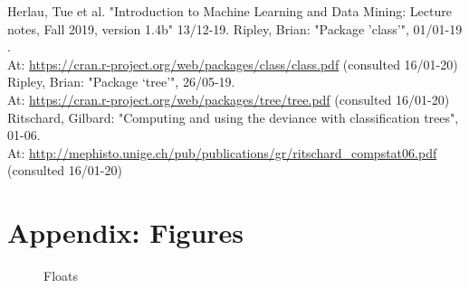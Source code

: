 \documentclass[11pt,fleqn]{article}
\begin{document}
\begin{thebibliography}{9}
	 Herlau, Tue et al. "Introduction to Machine Learning and Data Mining: Lecture notes, Fall 2019, version 1.4b" 13/12-19.
	 Ripley, Brian: "Package ’class’", 01/01-19 .\\
	At:
	\url{https://cran.r-project.org/web/packages/class/class.pdf} (consulted 16/01-20)
	 Ripley, Brian: "Package ‘tree’", 26/05-19.\\ At: \url{https://cran.r-project.org/web/packages/tree/tree.pdf} (consulted 16/01-20)
	 Ritschard, Gilbard: "Computing and using the deviance with classification trees", 01-06.\\
	 At:
	\url{http://mephisto.unige.ch/pub/publications/gr/ritschard_compstat06.pdf} (consulted 16/01-20)
\end{thebibliography}
\appendix
\section{Appendix: Figures}
\begin{figure}[H]
	
	\centering
	\caption{Floats}
	\label{fig:2dtrajects}
\end{figure}
\end{document}
